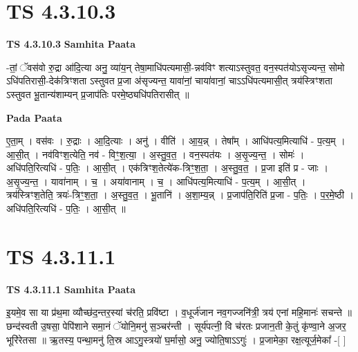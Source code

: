 \documentclass[17pt]{extarticle}
\begin{document}
\section*{ TS 4.3.10.3 }

\textbf{TS 4.3.10.3 } \newline
\textbf{Samhita Paata} \newline

-तां॒ ॅवस॑वो रु॒द्रा आ॑दि॒त्या अनु॒ व्या॑य॒न् तेषा॒माधि॑पत्यमासी॒-न्नव॑विꣳ शत्याऽस्तुवत॒ वन॒स्पत॑योऽसृज्यन्त॒ सोमो ऽधि॑पतिरासी॒-देक॑त्रिꣳशता ऽस्तुवत प्र॒जा अ॑सृज्यन्त॒ यावा॑नां॒ चाया॑वानां॒ चाऽऽधि॑पत्यमासी॒त् त्रय॑स्त्रिꣳशता ऽस्तुवत भू॒तान्य॑शाम्यन् प्र॒जाप॑तिः परमे॒ष्ठ्यधि॑पतिरासीत् ॥ \newline

\textbf{Pada Paata} \newline

ए॒ता॒म् । वस॑वः । रु॒द्राः । आ॒दि॒त्याः । अनु॑ । वीति॑ । आ॒य॒न्न् । तेषा᳚म् । आधि॑पत्य॒मित्याधि॑ - प॒त्य॒म् । आ॒सी॒त् । नव॑विꣳश॒त्येति॒ नव॑ - विꣳ॒॒श॒त्या॒ । अ॒स्तु॒व॒त॒ । वन॒स्पत॑यः । अ॒सृ॒ज्य॒न्त॒ । सोमः॑ । अधि॑पति॒रित्यधि॑ - प॒तिः॒ । आ॒सी॒त् । एक॑त्रिꣳश॒तेत्ये॑क-त्रिꣳ॒॒श॒ता॒ । अ॒स्तु॒व॒त॒ । प्र॒जा इति॑ प्र - जाः । अ॒सृ॒ज्य॒न्त॒ । यावा॑नाम् । च॒ । अया॑वानाम् । च॒ । आधि॑पत्य॒मित्याधि॑ - प॒त्य॒म् । आ॒सी॒त् । त्रय॑स्त्रिꣳश॒तेति॒ त्रयः॑-त्रिꣳ॒॒श॒ता॒ । अ॒स्तु॒व॒त॒ । भू॒तानि॑ । अ॒शा॒म्य॒न्न् । प्र॒जाप॑ति॒रिति॑ प्र॒जा - प॒तिः॒ । प॒र॒मे॒ष्ठी । अधि॑पति॒रित्यधि॑ - प॒तिः॒ । आ॒सी॒त् ॥  \newline




\section*{ TS 4.3.11.1 }

\textbf{TS 4.3.11.1 } \newline
\textbf{Samhita Paata} \newline

इ॒यमे॒व सा या प्र॑थ॒मा व्यौच्छ॑द॒न्तर॒स्यां च॑रति॒ प्रवि॑ष्टा । व॒धूर्ज॑जान नव॒गज्जनि॑त्री॒ त्रय॑ एनां महि॒मानः॑ सचन्ते ॥ छन्द॑स्वती उ॒षसा॒ पेपि॑शाने समा॒नं ॅयोनि॒मनु॑ स॒ञ्चर॑न्ती । सूर्य॑पत्नी॒ वि च॑रतः प्रजान॒ती के॒तुं कृ॑ण्वा॒ने अ॒जर॒ भूरि॑रेतसा ॥ ऋ॒तस्य॒ पन्था॒मनु॑ ति॒स्र आऽगु॒स्त्रयो॑ घ॒र्मासो॒ अनु॒ ज्योति॒षाऽऽगुः॑ । प्र॒जामेका॒ रक्ष॒त्यूर्ज॒मेका᳚ -[  ] \newline
\end{document}
